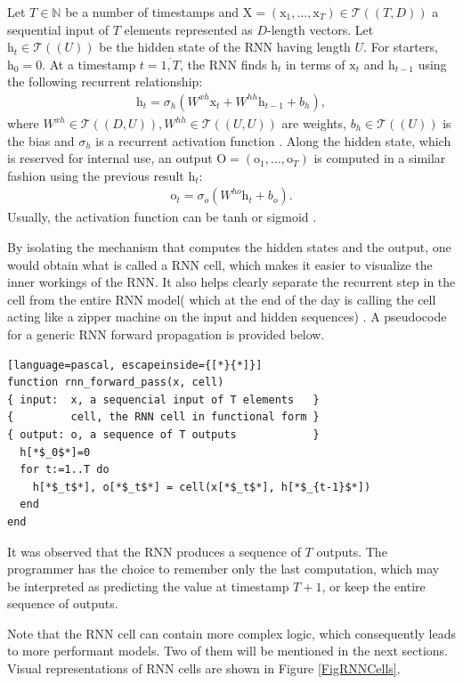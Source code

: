 Let $T\in\mathbb{N}$ be a number of timestamps and $\mathrm{X} = (\mathrm{x}_1, \ldots, \mathrm{x}_T) \in \mathcal{T}((T, D))$ a sequential input of $T$ elements represented as $D$-length vectors. Let $\mathrm{h}_t \in \mathcal{T}((U))$ be the hidden state of the RNN having length $U$. For starters, $\mathrm{h}_0 = 0$. At a timestamp $t=\overline{1,T}$, the RNN finds $\mathrm{h}_t$ in terms of $\mathrm{x}_t$ and $\mathrm{h}_{t-1}$ using the following recurrent relationship:
\begin{gather}
 \mathrm{h}_t = \sigma_h ( W^{xh} \mathrm{x}_t + W^{hh} \mathrm{h}_{t-1} + b_h), 
 \end{gather}
where $W^{xh} \in \mathcal{T}((D, U)), W^{hh} \in \mathcal{T}((U, U))$ are weights, $b_h \in \mathcal{T}((U))$ is the bias and $\sigma_h$ is a recurrent activation function \cite{rnn}. Along the hidden state, which is reserved for internal use, an output $\mathrm{O}=(\mathrm{o}_1,\ldots,\mathrm{o}_T)$ is computed in a similar fashion using the previous result $\mathrm{h}_t$:
\begin{gather} \mathrm{o}_t = \sigma_o(W^{ho} \mathrm{h}_t + b_o). \end{gather}
Usually, the activation function can be tanh or sigmoid \cite{rnn}.

By isolating the mechanism that computes the hidden states and the output, one would obtain what is called a RNN cell, which makes it easier to visualize the inner workings of the RNN. It also helps clearly separate the recurrent step in the cell from the entire RNN model( which at the end of the day is calling the cell acting like a zipper machine on the input and hidden sequences) \cite{rnn}. A pseudocode for a generic RNN forward propagation is provided below.
\begin{lstlisting}[language=pascal, escapeinside={[*}{*]}]
function rnn_forward_pass(x, cell)
{ input:  x, a sequencial input of T elements   }
{         cell, the RNN cell in functional form }
{ output: o, a sequence of T outputs            }
  h[*$_0$*]=0
  for t:=1..T do
    h[*$_t$*], o[*$_t$*] = cell(x[*$_t$*], h[*$_{t-1}$*])
  end
end
\end{lstlisting}

 It was observed that the RNN produces a sequence of $T$ outputs. The programmer has the choice to remember only the last computation, which may be interpreted as predicting the value at timestamp $T+1$, or keep the entire sequence of outputs. 

Note that the RNN cell can contain more complex logic, which consequently leads to more performant models. Two of them will be mentioned in the next sections. Visual representations of RNN cells are shown in Figure \ref{FigRNNCells}.

